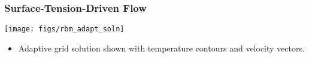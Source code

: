 \begin{frame}[t]
  \frametitle{Surface-Tension-Driven Flow}
  \begin{center}
    \texttt{[image: figs/rbm\_adapt\_soln]}    
  \end{center}

  \begin{block}{}
    \begin{itemize}
    \item{Adaptive grid solution shown
      with temperature contours and velocity vectors.
      }
      \end{itemize}
  \end{block}
\end{frame}
